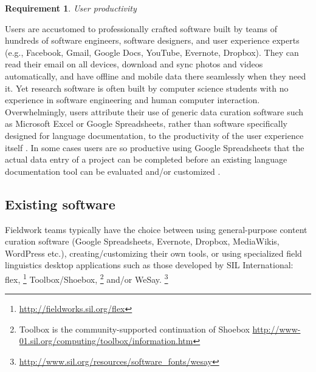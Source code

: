 \documentclass[11pt]{article}
\newcommand{\smalltodo}[2][]
    {\todo[caption={#2}, #1]
    {\tiny#2\normalsize}}
\newtheorem{requirement}{Requirement}
\begin{document}



\begin{requirement}
	\label{req:productivity}
       User productivity
\end{requirement}

Users are accustomed to professionally crafted software built by teams
of hundreds of software engineers, software designers, and user experience
experts (e.g., Facebook, Gmail, Google Docs, YouTube, Evernote, Dropbox). They
can read their email on all devices, download and sync photos and videos
automatically, and have offline and mobile data there seamlessly when they need
it. Yet research software is often built by computer science students with no
experience in software engineering and human computer interaction.
Overwhelmingly, users attribute their use of generic data curation software
such as Microsoft Excel or Google Spreadsheets, rather than software
specifically designed for language documentation, to the productivity of the
user experience itself \cite{lingsync:2012}. In some cases users are so
productive using Google Spreadsheets that the actual data entry of a project
can be completed before an existing language documentation tool can be
evaluated and/or customized \cite{Troy:2014}.


\subsection{Existing software}
\label{sec:existing-software}

Fieldwork teams typically have the choice between using general-purpose content
curation software (Google Spreadsheets, Evernote, Dropbox, MediaWikis,
WordPress etc.), creating/customizing their own tools, or using specialized
field linguistics desktop applications such as those developed by SIL
International: \gls{flex},%
\footnote{ \url{http://fieldworks.sil.org/flex} } %
 Toolbox/Shoebox,%
\footnote{Toolbox is the community-supported continuation of Shoebox
\url{http://www-01.sil.org/computing/toolbox/information.htm}} %
and/or WeSay.%
\footnote{\url{http://www.sil.org/resources/software\_fonts/wesay}}
\end{document}
